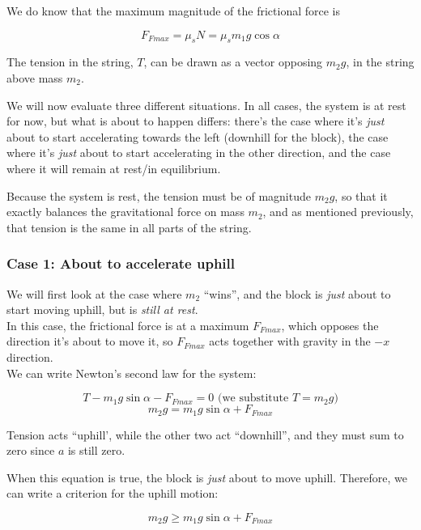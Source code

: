 \documentclass[8.01x]{subfiles}
\begin{document}
We do know that the maximum magnitude of the frictional force is

\begin{equation}
F_{Fmax} = \mu_s N = \mu_s m_1 g \cos \alpha
\end{equation}

The tension in the string, $T$, can be drawn as a vector opposing $m_2 g$, in the string above mass $m_2$.

We will now evaluate three different situations. In all cases, the system is at rest for now, but what is about to happen differs: there's the case where it's \emph{just} about to start accelerating towards the left (downhill for the block), the case where it's \emph{just} about to start accelerating in the other direction, and the case where it will remain at rest/in equilibrium.

Because the system is rest, the tension must be of magnitude $m_2 g$, so that it exactly balances the gravitational force on mass $m_2$, and as mentioned previously, that tension is the same in all parts of the string.

\subsubsection{Case 1: About to accelerate uphill}

We will first look at the case where $m_2$ ``wins'', and the block is \emph{just} about to start moving uphill, but is \emph{still at rest}.\\
In this case, the frictional force is at a maximum $F_{Fmax}$, which opposes the direction it's about to move it, so $F_{Fmax}$ acts together with gravity in the $-x$ direction.\\
We can write Newton's second law for the system:

\begin{equation}
T - m_1 g \sin \alpha - F_{Fmax} = 0\text{ (we substitute $T = m_2  g$)}
\end{equation}
\begin{equation}
m_2 g = m_1 g \sin \alpha + F_{Fmax}
\end{equation}

Tension acts ``uphill', while the other two act ``downhill'', and they must sum to zero since $a$ is still zero.

When this equation is true, the block is \emph{just} about to move uphill. Therefore, we can write a criterion for the uphill motion:

\begin{equation}
m_2 g \ge m_1 g \sin \alpha + F_{Fmax}
\end{equation}
\end{document}
